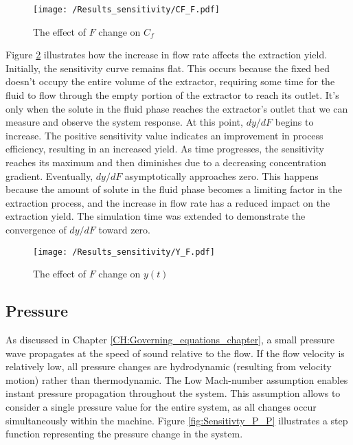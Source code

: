 \documentclass[../Article_Model_Parameters.tex]{subfiles}
\begin{document}
    \begin{figure}[h!]
    	\centering
    	\texttt{[image: /Results\_sensitivity/CF\_F.pdf]}
    	\caption{The effect of $F$ change on $C_f$}
    	\label{fig:Sensitivty_F_CF}
    \end{figure}

    Figure \ref{fig:Sensitivty_F_y} illustrates how the increase in flow rate affects the extraction yield. Initially, the sensitivity curve remains flat. This occurs because the fixed bed doesn't occupy the entire volume of the extractor, requiring some time for the fluid to flow through the empty portion of the extractor to reach its outlet. It's only when the solute in the fluid phase reaches the extractor's outlet that we can measure and observe the system response. At this point, $dy/dF$ begins to increase. The positive sensitivity value indicates an improvement in process efficiency, resulting in an increased yield. As time progresses, the sensitivity reaches its maximum and then diminishes due to a decreasing concentration gradient. Eventually, $dy/dF$ asymptotically approaches zero. This happens because the amount of solute in the fluid phase becomes a limiting factor in the extraction process, and the increase in flow rate has a reduced impact on the extraction yield. The simulation time was extended to demonstrate the convergence of $dy/dF$ toward zero.
    
    \begin{figure}[h!]
    	\centering
    	\texttt{[image: /Results\_sensitivity/Y\_F.pdf]}
    	\caption{The effect of $F$ change on $y(t)$}
    	\label{fig:Sensitivty_F_y}
    \end{figure}
    
    \subsection{Pressure}
    
    As discussed in Chapter \ref{CH:Governing_equations_chapter}, a small pressure wave propagates at the speed of sound relative to the flow. If the flow velocity is relatively low, all pressure changes are hydrodynamic (resulting from velocity motion) rather than thermodynamic. The Low Mach-number assumption enables instant pressure propagation throughout the system. This assumption allows to consider a single pressure value for the entire system, as all changes occur simultaneously within the machine. Figure \ref{fig:Sensitivty_P_P} illustrates a step function representing the pressure change in the system.
    
\end{document}
